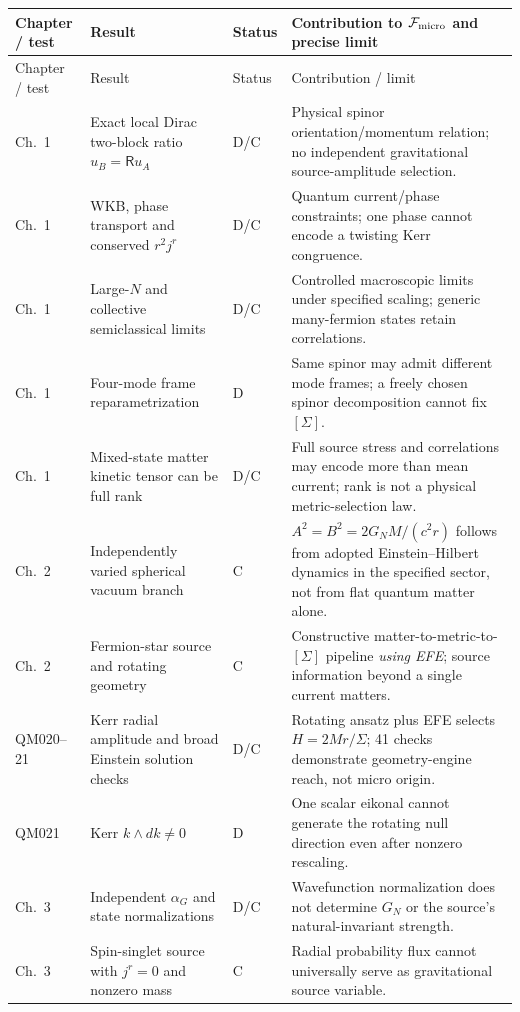 \documentclass[11pt,a4paper]{article}
\begin{document}
{\small\setlength\tabcolsep{4pt}
\begin{longtable}{@{}p{.07\linewidth}p{.29\linewidth}p{.09\linewidth}p{.46\linewidth}@{}}
\toprule Chapter / test & Result & Status & Contribution to $\mathcal F_{\rm micro}$ and precise limit\\\midrule
\endfirsthead
\toprule Chapter / test & Result & Status & Contribution / limit\\\midrule
\endhead
Ch.~1 & Exact local Dirac two-block ratio $u_B=\mathsf Ru_A$ & D/C & Physical spinor orientation/momentum relation; no independent gravitational source-amplitude selection.\\
Ch.~1 & WKB, phase transport and conserved $r^2j^r$ & D/C & Quantum current/phase constraints; one phase cannot encode a twisting Kerr congruence.\\
Ch.~1 & Large-$N$ and collective semiclassical limits & D/C & Controlled macroscopic limits under specified scaling; generic many-fermion states retain correlations.\\
Ch.~1 & Four-mode frame reparametrization & D & Same spinor may admit different mode frames; a freely chosen spinor decomposition cannot fix $[\Sigma]$.\\
Ch.~1 & Mixed-state matter kinetic tensor can be full rank & D/C & Full source stress and correlations may encode more than mean current; rank is not a physical metric-selection law.\\
Ch.~2 & Independently varied spherical vacuum branch & C & $A^2=B^2=2G_NM/(c^2r)$ follows from adopted Einstein--Hilbert dynamics in the specified sector, not from flat quantum matter alone.\\
Ch.~2 & Fermion-star source and rotating geometry & C & Constructive matter-to-metric-to-$[\Sigma]$ pipeline \emph{using EFE}; source information beyond a single current matters.\\
QM020--21 & Kerr radial amplitude and broad Einstein solution checks & D/C & Rotating ansatz plus EFE selects $H=2Mr/\Sigma$; 41 checks demonstrate geometry-engine reach, not micro origin.\\
QM021 & Kerr $k\wedge dk\ne0$ & D & One scalar eikonal cannot generate the rotating null direction even after nonzero rescaling.\\
Ch.~3 & Independent $\alpha_G$ and state normalizations & D/C & Wavefunction normalization does not determine $G_N$ or the source's natural-invariant strength.\\
Ch.~3 & Spin-singlet source with $j^r=0$ and nonzero mass & C & Radial probability flux cannot universally serve as gravitational source variable.\\

\end{longtable}}
\end{document}

